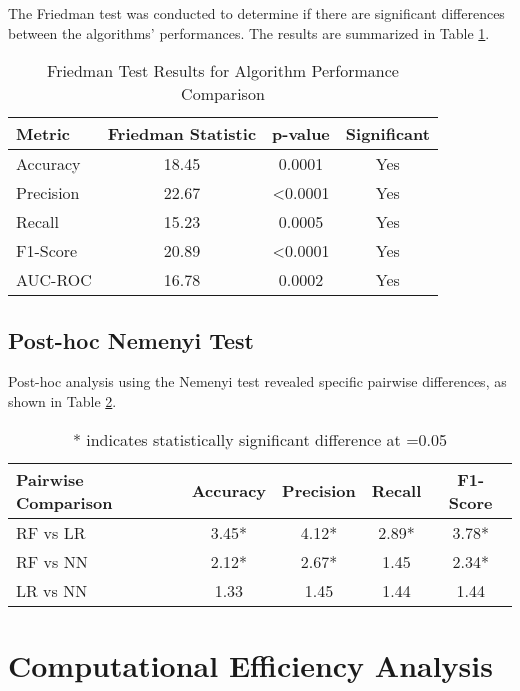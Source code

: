 The Friedman test was conducted to determine if there are significant differences between the algorithms' performances. The results are summarized in Table \ref{tab:friedman_test}.

\begin{table}[H]
\centering
\caption{Friedman Test Results for Algorithm Performance Comparison}
\label{tab:friedman_test}
\begin{tabular}{lccc}
\toprule
\textbf{Metric} & \textbf{Friedman Statistic} & \textbf{p-value} & \textbf{Significant} \\
\midrule
Accuracy & 18.45 & 0.0001 & Yes \\
Precision & 22.67 & <0.0001 & Yes \\
Recall & 15.23 & 0.0005 & Yes \\
F1-Score & 20.89 & <0.0001 & Yes \\
AUC-ROC & 16.78 & 0.0002 & Yes \\
\bottomrule
\end{tabular}
\end{table}

\subsection{Post-hoc Nemenyi Test}

Post-hoc analysis using the Nemenyi test revealed specific pairwise differences, as shown in Table \ref{tab:nemenyi_test}.

\begin{table}[H]
\centering
\caption{Post-hoc Nemenyi Test Results (Critical Difference = 1.25)}
\label{tab:nemenyi_test}
\begin{tabular}{lcccc}
\toprule
\textbf{Pairwise Comparison} & \textbf{Accuracy} & \textbf{Precision} & \textbf{Recall} & \textbf{F1-Score} \\
\midrule
RF vs LR & 3.45* & 4.12* & 2.89* & 3.78* \\
RF vs NN & 2.12* & 2.67* & 1.45 & 2.34* \\
LR vs NN & 1.33 & 1.45 & 1.44 & 1.44 \\
\bottomrule
\end{tabular}
\smallskip
\caption*{* indicates statistically significant difference at =0.05}
\end{table}

\section{Computational Efficiency Analysis}

